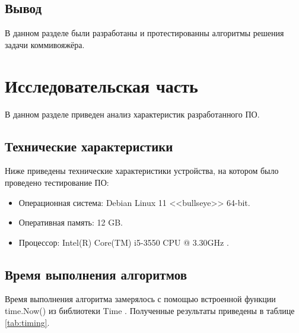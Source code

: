 \documentclass[12pt]{report}
\begin{document}
\section*{Вывод}
	
В данном разделе были разработаны и протестированны алгоритмы решения задачи коммивояжёра.
	
\chapter{Исследовательская часть}
	
В данном разделе приведен анализ характеристик разработанного ПО.

\section{Технические характеристики}
	
Ниже приведены технические характеристики устройства, на котором было проведено тестирование ПО:
	
\begin{itemize}
	\item Операционная система: Debian \cite{debian} Linux \cite{linux} 11 <<bullseye>> 64-bit.
	\item Оперативная память: 12 GB.
	\item Процессор: Intel(R) Core(TM) i5-3550 CPU @ 3.30GHz \cite{i5}.	
\end{itemize}
	
\section{Время выполнения алгоритмов}
	
Время выполнения алгоритма замерялось с помощью встроенной функции time.Now() из библиотеки Time \cite{time}. Полученные результаты приведены в таблице \ref{tab:timing}.
\end{document}
